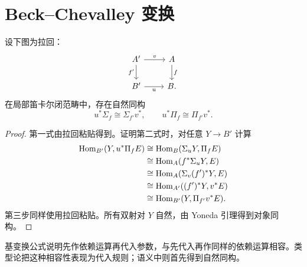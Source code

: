 \section{Beck--Chevalley 变换}
\begin{theorem}[基变换公式]\label{thm:beck}
设下图为拉回：
\[
\begin{tikzcd}
A'\ar[r,"v"]\ar[d,"f'"']&A\ar[d,"f"]\\
B'\ar[r,"u"']&B.
\end{tikzcd}
\]
在局部笛卡尔闭范畴中，存在自然同构
\[
u^*\Sigma_f\cong\Sigma_{f'}v^*,
\qquad u^*\Pi_f\cong\Pi_{f'}v^*.
\]
\end{theorem}
\begin{proof}
第一式由拉回粘贴得到。证明第二式时，对任意 $Y\to B'$ 计算
\begin{align*}
\operatorname{Hom}_{B'}(Y,u^*\Pi_fE)
&\cong\operatorname{Hom}_B(\Sigma_uY,\Pi_fE)\\
&\cong\operatorname{Hom}_A(f^*\Sigma_uY,E)\\
&\cong\operatorname{Hom}_A(\Sigma_v(f')^*Y,E)\\
&\cong\operatorname{Hom}_{A'}((f')^*Y,v^*E)\\
&\cong\operatorname{Hom}_{B'}(Y,\Pi_{f'}v^*E).
\end{align*}
第三步同样使用拉回粘贴。所有双射对 $Y$ 自然，由 Yoneda 引理得到对象同构。
\end{proof}
\begin{remark}
基变换公式说明先作依赖运算再代入参数，与先代入再作同样的依赖运算相容。类型论把这种相容性表现为代入规则；语义中则首先得到自然同构。
\end{remark}


